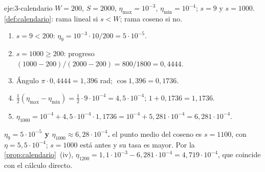 \begin{solucion}{eje:3-calendario}
\datos $W=200$, $S=2000$, $\eta_{\max}=10^{-3}$, $\eta_{\min}=10^{-4}$; $s=9$ y $s=1000$.
\planteamiento \cref{def:calendario}: rama lineal si $s<W$; rama coseno si no.
\pasos
\begin{enumerate}[label=\arabic*.]
  \item $s=9<200$: $\eta_9=10^{-3}\cdot 10/200=5\cdot 10^{-5}$.
  \item $s=1000\ge 200$: progreso $(1000-200)/(2000-200)=800/1800=0{,}4444$.
  \item Ángulo $\pi\cdot 0{,}4444=1{,}396$ rad; $\cos 1{,}396=0{,}1736$.
  \item $\tfrac12(\eta_{\max}-\eta_{\min})=\tfrac12\cdot 9\cdot 10^{-4}=4{,}5\cdot 10^{-4}$; $1+0{,}1736=1{,}1736$.
  \item $\eta_{1000}=10^{-4}+4{,}5\cdot 10^{-4}\cdot 1{,}1736=10^{-4}+5{,}281\cdot 10^{-4}=6{,}281\cdot 10^{-4}$.
\end{enumerate}
\resultado \textbf{$\eta_9=5\cdot 10^{-5}$ y $\eta_{1000}\approx 6{,}28\cdot 10^{-4}$.}
\comprobacion el punto medio del coseno es $s=1100$, con $\eta=5{,}5\cdot 10^{-4}$; $s=1000$ está antes y su tasa es mayor. Por la \cref{prop:calendario}~(iv), $\eta_{1200}=1{,}1\cdot 10^{-3}-6{,}281\cdot 10^{-4}=4{,}719\cdot 10^{-4}$, que coincide con el cálculo directo.
\end{solucion}

